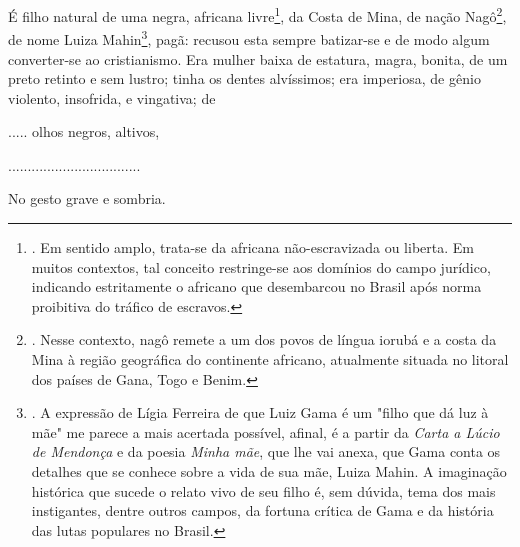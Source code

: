 É filho natural de uma negra, africana livre\footnote{. Em sentido
  amplo, trata-se da africana não-escravizada ou liberta. Em muitos
  contextos, tal conceito restringe-se aos domínios do campo jurídico,
  indicando estritamente o africano que desembarcou no Brasil após norma
  proibitiva do tráfico de escravos.}, da Costa de Mina, de nação
Nagô\footnote{. Nesse contexto, nagô remete a um dos povos de língua
  iorubá e a costa da Mina à região geográfica do continente africano,
  atualmente situada no litoral dos países de Gana, Togo e Benim.}, de
nome Luiza Mahin\footnote{. A expressão de Lígia Ferreira de que Luiz
  Gama é um "filho que dá luz à mãe" me parece a mais acertada possível,
  afinal, é a partir da \emph{Carta a Lúcio de Mendonça} e da poesia
  \emph{Minha mãe}, que lhe vai anexa, que Gama conta os detalhes que se
  conhece sobre a vida de sua mãe, Luiza Mahin. A imaginação histórica
  que sucede o relato vivo de seu filho é, sem dúvida, tema dos mais
  instigantes, dentre outros campos, da fortuna crítica de Gama e da
  história das lutas populares no Brasil.}, pagã: recusou esta sempre
batizar-se e de modo algum converter-se ao cristianismo. Era mulher
baixa de estatura, magra, bonita, de um preto retinto e sem lustro;
tinha os dentes alvíssimos; era imperiosa, de gênio violento, insofrida,
e vingativa; de

..... olhos negros, altivos,

..................................

No gesto grave e sombria.

